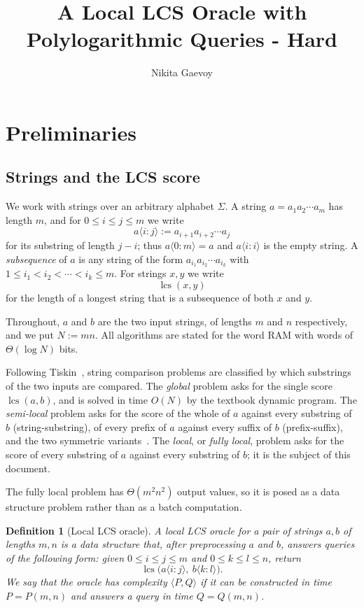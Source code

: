 \documentclass[10pt]{article}
\title{A Local LCS Oracle with Polylogarithmic Queries - Hard}
\author{Nikita Gaevoy}
\date{}
\newtheorem{definition}{Definition}
\newcommand{\lcs}{\operatorname{lcs}}
\begin{document}
\maketitle

\section{Preliminaries}

\subsection{Strings and the LCS score}

We work with strings over an arbitrary alphabet $\Sigma$. A string
$a=a_1a_2\cdots a_m$ has length $m$, and for $0\le i\le j\le m$ we write
\[
a\langle i:j\rangle:=a_{i+1}a_{i+2}\cdots a_j
\]
for its substring of length $j-i$; thus $a\langle 0:m\rangle=a$ and
$a\langle i:i\rangle$ is the empty string. A \emph{subsequence} of $a$ is any
string of the form $a_{i_1}a_{i_2}\cdots a_{i_k}$ with
$1\le i_1<i_2<\cdots<i_k\le m$. For strings $x,y$ we write
\[
\lcs(x,y)
\]
for the length of a longest string that is a subsequence of both $x$ and $y$.

Throughout, $a$ and $b$ are the two input strings, of lengths $m$ and $n$
respectively, and we put $N:=mn$. All algorithms are stated for the word RAM
with words of $\Theta(\log N)$ bits.

Following Tiskin~\cite{Tiskin08,TiskinArXiv}, string comparison problems are
classified by which substrings of the two inputs are compared. The
\emph{global} problem asks for the single score $\lcs(a,b)$, and is solved in
time $O(N)$ by the textbook dynamic program. The \emph{semi-local} problem
asks for the score of the whole of $a$ against every substring of $b$
(string-substring), of every prefix of $a$ against every suffix of $b$
(prefix-suffix), and the two symmetric variants~\cite[Definition 4.3]{TiskinArXiv}.
The \emph{local}, or \emph{fully local}, problem asks for the score of every
substring of $a$ against every substring of $b$; it is the subject of this
document.

The fully local problem has $\Theta(m^2n^2)$ output values, so it is posed as
a data structure problem rather than as a batch computation.

\begin{definition}[Local LCS oracle]\label{def:oracle}
A \emph{local LCS oracle} for a pair of strings $a,b$ of lengths $m,n$ is a
data structure that, after preprocessing $a$ and $b$, answers queries of the
following form: given $0\le i\le j\le m$ and $0\le k\le l\le n$, return
\[
\lcs\bigl(a\langle i:j\rangle,\ b\langle k:l\rangle\bigr).
\]
We say that the oracle has \emph{complexity} $\langle P,Q\rangle$ if it can be
constructed in time $P=P(m,n)$ and answers a query in time $Q=Q(m,n)$.
\end{definition}
\end{document}
